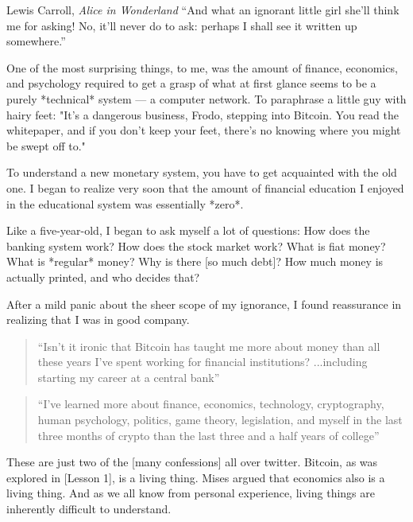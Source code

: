 \label{les:8}

\begin{chapquote}{Lewis Carroll, \textit{Alice in Wonderland}}
``And what an ignorant little girl she'll think me for asking! No, it'll never
do to ask: perhaps I shall see it written up somewhere.''
\end{chapquote}

One of the most surprising things, to me, was the amount of finance,
economics, and psychology required to get a grasp of what at first
glance seems to be a purely *technical* system --- a computer network.
To paraphrase a little guy with hairy feet: "It's a dangerous business,
Frodo, stepping into Bitcoin. You read the whitepaper, and if you don't
keep your feet, there's no knowing where you might be swept off to."

To understand a new monetary system, you have to get acquainted with the
old one. I began to realize very soon that the amount of financial
education I enjoyed in the educational system was essentially *zero*.

Like a five-year-old, I began to ask myself a lot of questions: How does
the banking system work? How does the stock market work? What is fiat
money? What is *regular* money? Why is there [so much debt]? How much
money is actually printed, and who decides that?

After a mild panic about the sheer scope of my ignorance, I found
reassurance in realizing that I was in good company.

\begin{quotation}
``Isn't it ironic that Bitcoin has taught me more about money than all
these years I've spent working for financial
institutions? ...including starting my career at a central
bank''
\end{quotation}

\begin{quotation}
``I've learned more about finance, economics, technology, cryptography,
human psychology, politics, game theory, legislation, and myself in
the last three months of crypto than the last three and a half years
of college''
\end{quotation}

These are just two of the [many confessions] all over twitter. Bitcoin,
as was explored in [Lesson 1], is a living thing. Mises argued that
economics also is a living thing. And as we all know from personal
experience, living things are inherently difficult to understand.

